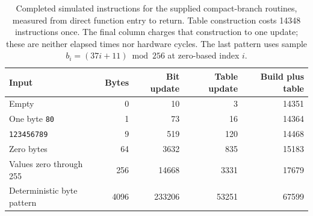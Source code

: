 \begin{table}[htbp]
  \centering
  \begin{tabular}{l r r r r}
    \toprule
    Input                      & Bytes & Bit update & Table update & Build plus table \\
    \midrule
    Empty                      & 0     & 10         & 3            & 14351            \\
    One byte \texttt{80}       & 1     & 73         & 16           & 14364            \\
    \texttt{123456789}         & 9     & 519        & 120          & 14468            \\
    Zero bytes                 & 64    & 3632       & 835          & 15183            \\
    Values zero through 255    & 256   & 14668      & 3331         & 17679            \\
    Deterministic byte pattern & 4096  & 233206     & 53251        & 67599            \\
    \bottomrule
  \end{tabular}
  \caption{Completed simulated instructions for the supplied compact-branch routines, measured from direct function entry to return. Table construction costs 14348 instructions once. The final column charges that construction to one update; these are neither elapsed times nor hardware cycles. The last pattern uses sample $b_i=(37i+11)\bmod256$ at zero-based index $i$.}
  \label{tab:revision-crc-work}
\end{table}
